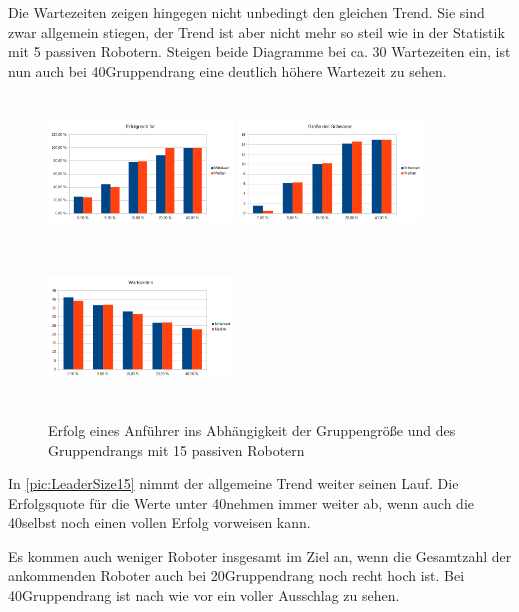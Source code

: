 Die Wartezeiten zeigen hingegen nicht unbedingt den gleichen Trend. Sie sind zwar allgemein stiegen, der Trend ist aber nicht mehr so steil wie in der Statistik mit 5 passiven Robotern. Steigen beide Diagramme bei ca. 30 Wartezeiten ein, ist nun auch bei 40\per Gruppendrang eine deutlich höhere Wartezeit zu sehen.

\begin{figure}
	\includegraphics[width=4.9cm, height=4cm]{graphics/Statistics/Leader/FlockSize/15_1.png}
	\includegraphics[width=4.9cm, height=4cm]{graphics/Statistics/Leader/FlockSize/15_2.png}
	\includegraphics[width=4.9cm, height=4cm]{graphics/Statistics/Leader/FlockSize/15_3.png}
	\caption{Erfolg eines Anführer ins Abhängigkeit der Gruppengröße und des Gruppendrangs mit 15 passiven Robotern}
	\label{pic:LeaderSize15}
\end{figure}

In \autoref{pic:LeaderSize15} nimmt der allgemeine Trend weiter seinen Lauf. Die Erfolgsquote für die Werte unter 40\per nehmen immer weiter ab, wenn auch die 40\per selbst noch einen vollen Erfolg vorweisen kann.

Es kommen auch weniger Roboter insgesamt im Ziel an, wenn die Gesamtzahl der ankommenden Roboter auch bei 20\per Gruppendrang noch recht hoch ist. Bei 40\per Gruppendrang ist nach wie vor ein voller Ausschlag zu sehen.

